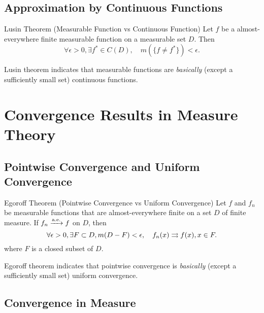 \subsection{Approximation by Continuous Functions}

\begin{theorem}{Lusin Theorem (Measurable Function vs Continuous Function)}{}
  Let $f$ be a almost-everywhere finite measurable function on a measurable set
  $D$.
  Then
  \begin{equation}
    \forall \epsilon > 0, \exists f^{\ast} \in C(D), \quad
    m(\{f \neq f^{\ast}\}) < \epsilon.
  \end{equation}
\end{theorem}

\begin{note}
  Lusin theorem indicates that measurable functions are
  \emph{basically} (except a sufficiently small set) continuous functions.
\end{note}

\section{Convergence Results in Measure Theory}

\subsection{Pointwise Convergence and Uniform Convergence}

\begin{theorem}{Egoroff Theorem (Pointwise Convergence vs Uniform Convergence)}{}
  Let $f$ and $f_n$ be measurable functions that are almost-everywhere finite
  on a set $D$ of finite measure.
  If $f_n \xrightarrow{\text{a.e.}} f$ on $D$,
  then
  \begin{equation}
    \forall \epsilon > 0, \exists F \subset D, m(D - F) < \epsilon, \quad
    f_n(x) \rightrightarrows f(x), x \in F.
  \end{equation}
  where $F$ is a closed subset of $D$.
\end{theorem}

\begin{note}
  Egoroff theorem indicates that pointwise convergence is
  \emph{basically} (except a sufficiently small set) uniform convergence.
\end{note}

\subsection{Convergence in Measure}

